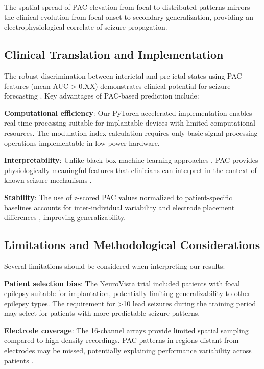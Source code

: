 The spatial spread of PAC elevation from focal to distributed patterns mirrors the clinical evolution from focal onset to secondary generalization, providing an electrophysiological correlate of seizure propagation.

\subsection{Clinical Translation and Implementation}
The robust discrimination between interictal and pre-ictal states using PAC features (mean AUC > 0.XX) demonstrates clinical potential for seizure forecasting \cite{Kuhlmann2018SeizurePA,Freestone2015SeizurePSBF}. Key advantages of PAC-based prediction include:

\textbf{Computational efficiency}: Our PyTorch-accelerated implementation \cite{Combrisson2020TensorpacAOAH} enables real-time processing suitable for implantable devices with limited computational resources. The modulation index calculation \cite{Tort2010MeasuringPCE,Hlsemann2019QuantificationOPA} requires only basic signal processing operations implementable in low-power hardware.

\textbf{Interpretability}: Unlike black-box machine learning approaches \cite{Natu2022ReviewOEB,Dissanayake2020PatientindependentESY}, PAC provides physiologically meaningful features that clinicians can interpret in the context of known seizure mechanisms \cite{Canolty2010TheFRC,Aru2014UntanglingCCD}.

\textbf{Stability}: The use of z-scored PAC values normalized to patient-specific baselines accounts for inter-individual variability and electrode placement differences \cite{Aldahr2023PatientSpecificPPL,Pinto2021APAP}, improving generalizability.

\subsection{Limitations and Methodological Considerations}

Several limitations should be considered when interpreting our results:

\textbf{Patient selection bias}: The NeuroVista trial \cite{Kuhlmann2018SeizurePA} included patients with focal epilepsy suitable for implantation, potentially limiting generalizability to other epilepsy types. The requirement for >10 lead seizures during the training period may select for patients with more predictable seizure patterns.

\textbf{Electrode coverage}: The 16-channel arrays provide limited spatial sampling compared to high-density recordings. PAC patterns in regions distant from electrodes may be missed, potentially explaining performance variability across patients \cite{Hussein2019HumanIEAQ}.

